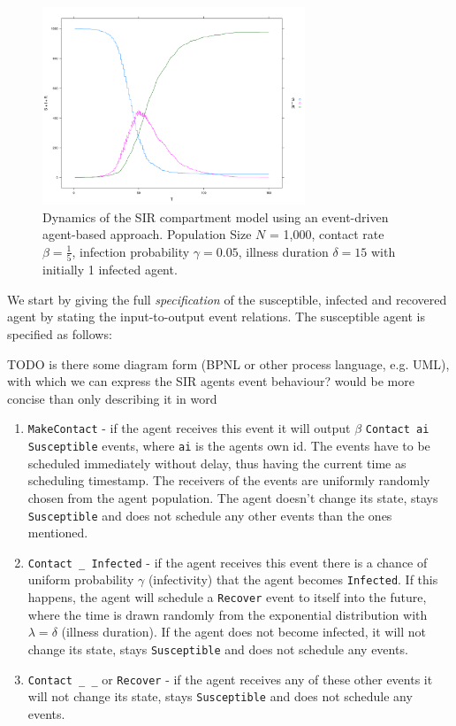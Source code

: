 \begin{figure}
	\centering
	\includegraphics[width=0.7\textwidth, angle=0]{./fig/sir_eventdriven.png}
	\caption{Dynamics of the SIR compartment model using an event-driven agent-based approach. Population Size $N$ = 1,000, contact rate $\beta =  \frac{1}{5}$, infection probability $\gamma = 0.05$, illness duration $\delta = 15$ with initially 1 infected agent.}
	\label{fig:sir_sd_dynamics}
\end{figure}

We start by giving the full \textit{specification} of the susceptible, infected and recovered agent by stating the input-to-output event relations. The susceptible agent is specified as follows:

TODO is there some diagram form (BPNL or other process language, e.g. UML), with which we can express the SIR agents event behaviour? would be more concise than only describing it in word

\begin{enumerate}
	\item \texttt{MakeContact} - if the agent receives this event it will output $\beta$ \texttt{Contact ai Susceptible} events, where \texttt{ai} is the agents own id. The events have to be scheduled immediately without delay, thus having the current time as scheduling timestamp. The receivers of the events are uniformly randomly chosen from the agent population. The agent doesn't change its state, stays \texttt{Susceptible} and does not schedule any other events than the ones mentioned.
	
	\item \texttt{Contact \_ Infected} - if the agent receives this event there is a chance of uniform probability $\gamma$ (infectivity) that the agent becomes \texttt{Infected}. If this happens, the agent will schedule a \texttt{Recover} event to itself into the future, where the time is drawn randomly from the exponential distribution with $\lambda = \delta$ (illness duration). If the agent does not become infected, it will not change its state, stays \texttt{Susceptible} and does not schedule any events.
	
	\item \texttt{Contact \_ \_} or \texttt{Recover} - if the agent receives any of these other events it will not change its state, stays \texttt{Susceptible} and does not schedule any events.
\end{enumerate}

